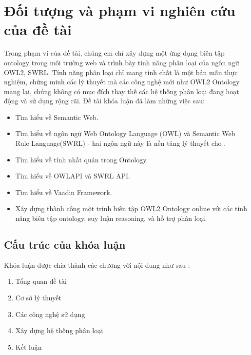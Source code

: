 \section{Đối tượng và phạm vi nghiên cứu của đề tài}
Trong phạm vi của đề tài, chúng em chỉ xây dựng một ứng dụng biên tập ontology trong môi trường web và trình bày tính năng phân loại của ngôn ngữ OWL2, SWRL. Tính năng phân loại chỉ mang tính chất là một bản mẫu thực nghiệm, chứng minh các lý thuyết mà các công nghệ mới như OWL2 Ontology mang lại, chúng không có mục đích thay thế các hệ thống phân loại đang hoạt động và sử dụng rộng rãi.
Đề tài khóa luận đã làm những việc sau:
\begin{itemize}
\item Tìm hiểu về Semantic Web.
\item Tìm hiểu về ngôn ngữ Web Ontology Language (OWL) và Semantic Web Rule Language(SWRL) - hai ngôn ngữ này là nền tảng lý thuyết cho .
\item Tìm hiểu về tính nhất quán trong Ontology.
\item Tìm hiểu về OWLAPI và SWRL API.
\item Tìm hiểu về Vaadin Framework.
\item Xây dựng thành công một trình biên tập OWL2 Ontology online với các tính năng biên tập ontology, suy luận reasoning, và hỗ trợ phân loại.
\end{itemize}

\subsection{Cấu trúc của khóa luận}
Khóa luận được chia thành các chương với nội dung như sau : 
\begin{enumerate}
\item Tổng quan đề tài
\item Cơ sở lý thuyết
\item Các công nghệ sử dụng
\item Xây dựng hệ thống phân loại
\item Kết luận 
\end{enumerate}
